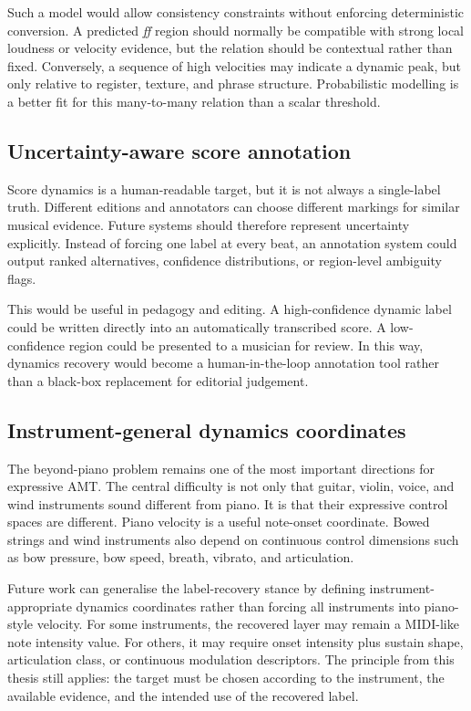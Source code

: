 Such a model would allow consistency constraints without enforcing deterministic conversion. A predicted \textit{ff} region should normally be compatible with strong local loudness or velocity evidence, but the relation should be contextual rather than fixed. Conversely, a sequence of high velocities may indicate a dynamic peak, but only relative to register, texture, and phrase structure. Probabilistic modelling is a better fit for this many-to-many relation than a scalar threshold.

\subsection{Uncertainty-aware score annotation}
\label{ssec:conclusion:future_uncertainty}

Score dynamics is a human-readable target, but it is not always a single-label truth. Different editions and annotators can choose different markings for similar musical evidence. Future systems should therefore represent uncertainty explicitly. Instead of forcing one label at every beat, an annotation system could output ranked alternatives, confidence distributions, or region-level ambiguity flags.

This would be useful in pedagogy and editing. A high-confidence dynamic label could be written directly into an automatically transcribed score. A low-confidence region could be presented to a musician for review. In this way, dynamics recovery would become a human-in-the-loop annotation tool rather than a black-box replacement for editorial judgement.

\subsection{Instrument-general dynamics coordinates}
\label{ssec:conclusion:future_instruments}

The beyond-piano problem remains one of the most important directions for expressive AMT. The central difficulty is not only that guitar, violin, voice, and wind instruments sound different from piano. It is that their expressive control spaces are different. Piano velocity is a useful note-onset coordinate. Bowed strings and wind instruments also depend on continuous control dimensions such as bow pressure, bow speed, breath, vibrato, and articulation.

Future work can generalise the label-recovery stance by defining instrument-appropriate dynamics coordinates rather than forcing all instruments into piano-style velocity. For some instruments, the recovered layer may remain a MIDI-like note intensity value. For others, it may require onset intensity plus sustain shape, articulation class, or continuous modulation descriptors. The principle from this thesis still applies: the target must be chosen according to the instrument, the available evidence, and the intended use of the recovered label.

